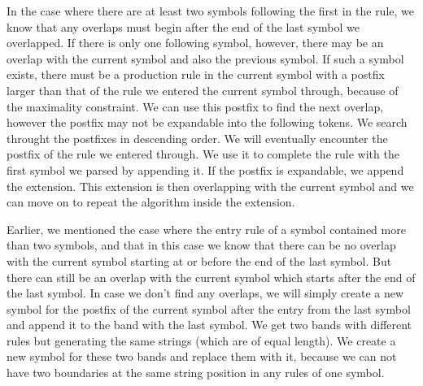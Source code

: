 In the case where there are at least two symbols following the first in the rule, we know that any overlaps must begin 
after the end of the last symbol we overlapped. If there is only one following symbol, however, there may be an overlap 
with the current symbol and also the previous symbol. If such a symbol exists, there must be a production rule in the 
current symbol with a postfix larger than that of the rule we entered the current symbol through, because of the 
maximality constraint. We can use this postfix to find the next overlap, however the postfix may not be expandable into 
the following tokens. We search throught the postfixes in descending order. We will eventually encounter the postfix of 
the rule we entered through. We use it to complete the rule with the first symbol we parsed by appending it. If the 
postfix is expandable, we append the extension. This extension is then overlapping with the current symbol and we can 
move on to repeat the algorithm inside the extension.

Earlier, we mentioned the case where the entry rule of a symbol contained more than two symbols, and that in this case 
we know that there can be no overlap with the current symbol starting at or before the end of the last symbol. But there 
can still be an overlap with the current symbol which starts after the end of the last symbol. In case we don't find any 
overlaps, we will simply create a new symbol for the postfix of the current symbol after the entry from the last symbol 
and append it to the band with the last symbol. We get two bands with different rules but generating the same strings 
(which are of equal length). We create a new symbol for these two bands and replace them with it, because we can not have 
two boundaries at the same string position in any rules of one symbol. 
